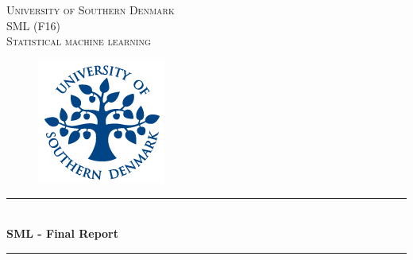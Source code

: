 \documentclass[11pt]{article}
\begin{document}
\begin{titlepage}
\newcommand{\HRule}{\rule{\linewidth}{0.5mm}} %

\center %
 

\textsc{\LARGE University of Southern Denmark}\\[1cm] %
\textsc{\Large SML (F16)}\\[0.3cm] %
\textsc{\large Statistical machine learning }\\[0.3cm] %
\vspace{0.5cm}
\begin{figure}[H]
\centering
\includegraphics[scale=1]{img/sdu-segl.png}
\end{figure}
\vspace{0.4cm}

\HRule \\[0.4cm]
{ \huge \bfseries SML - Final Report}\\[0.4cm] %
\HRule \\[1.5cm]
 


\end{titlepage}
\end{document}
